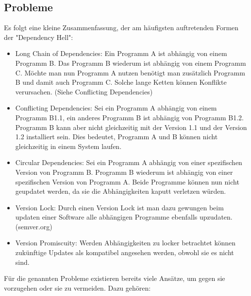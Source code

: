  \subsection{Probleme}
Es folgt eine kleine Zusammenfassung, der am häufigsten auftretenden Formen der "Dependency Hell":
\begin{itemize}
 \item Long Chain of Dependencies: Ein Programm A ist abhängig von einem Programm B. Das Programm B wiederum ist abhängig von einem Programm C.
Möchte man nun Programm  A nutzen benötigt man zusätzlich Programm  B und damit auch Programm C. Solche lange Ketten können Konflikte verursachen.
(Siehe Conflicting Dependencies)
\item Conflicting Dependencies: Sei ein Programm A abhängig von einem Programm B1.1, ein anderes Programm B ist abhängig von  Programm B1.2. Programm B 
kann aber nicht gleichzeitig mit der Version 1.1 und der Version 1.2 installiert sein. Dies bedeutet, Programm A und B können nicht gleichzeitig in einem System laufen.
\item Circular Dependencies: Sei ein Programm A abhängig von einer spezifischen Version von Programm B. Programm B wiederum ist abhängig von einer spezifischen
Version von Programm A. Beide Programme können nun nicht geupdatet werden, da sie die Abhängigkeiten kaputt verletzen würden.
\item Version Lock: Durch einen Version Lock ist man dazu gewungen beim updaten einer Software alle abhängigen Programme ebenfalls upzudaten. (semver.org)
\item Version Promiscuity: Werden Abhängigkeiten zu locker betrachtet können zukünftige Updates als kompatibel angesehen werden, obwohl sie es nicht sind.
\end{itemize}

Für die genannten Probleme existieren bereits viele Ansätze, um gegen sie vorzugehen oder sie zu vermeiden. Dazu gehören:

